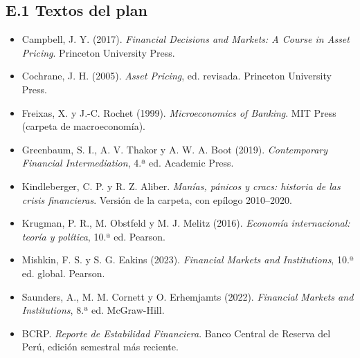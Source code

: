 \documentclass[11pt,a4paper]{article}
\begin{document}
\subsection*{E.1 Textos del plan}
{\small
\begin{itemize}[leftmargin=1.4em,itemsep=1pt,label={}]
\item Campbell, J. Y. (2017). \emph{Financial Decisions and Markets: A Course in Asset Pricing}. Princeton University Press.
\item Cochrane, J. H. (2005). \emph{Asset Pricing}, ed. revisada. Princeton University Press.
\item Freixas, X. y J.-C. Rochet (1999). \emph{Microeconomics of Banking}. MIT Press (carpeta de macroeconomía).
\item Greenbaum, S. I., A. V. Thakor y A. W. A. Boot (2019). \emph{Contemporary Financial Intermediation}, 4.ª ed. Academic Press.
\item Kindleberger, C. P. y R. Z. Aliber. \emph{Manías, pánicos y cracs: historia de las crisis financieras}. Versión de la carpeta, con epílogo 2010--2020.
\item Krugman, P. R., M. Obstfeld y M. J. Melitz (2016). \emph{Economía internacional: teoría y política}, 10.ª ed. Pearson.
\item Mishkin, F. S. y S. G. Eakins (2023). \emph{Financial Markets and Institutions}, 10.ª ed. global. Pearson.
\item Saunders, A., M. M. Cornett y O. Erhemjamts (2022). \emph{Financial Markets and Institutions}, 8.ª ed. McGraw-Hill.
\item BCRP. \emph{Reporte de Estabilidad Financiera}. Banco Central de Reserva del Perú, edición semestral más reciente.
\end{itemize}
}
\end{document}
